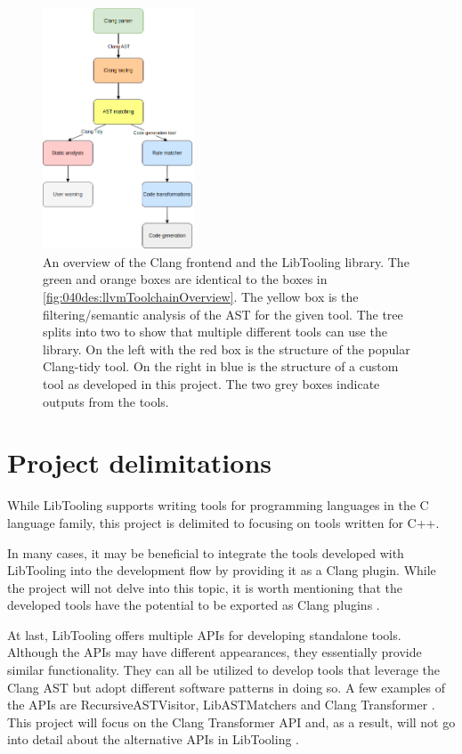 \begin{figure}[H]
    \centering
    \includegraphics[width=0.4\textwidth]{figs/040des/clang_tool_pipeline.png}
    \caption{An overview of the Clang frontend and the LibTooling library. The green and orange boxes are identical to the boxes in \cref{fig:040des:llvmToolchainOverview}. The yellow box is the filtering/semantic analysis of the AST for the given tool. The tree splits into two to show that multiple different tools can use the library. On the left with the red box is the structure of the popular Clang-tidy tool\cite{clangClangTidyExtraClang}. On the right in blue is the structure of a custom tool as developed in this project. The two grey boxes indicate outputs from the tools.}
    \label{fig:040des:clangToolingOverview}
\end{figure}


\section{Project delimitations}
While LibTooling supports writing tools for programming languages in the C language family, this project is delimited to focusing on tools written for C++.

In many cases, it may be beneficial to integrate the tools developed with LibTooling into the development flow by providing it as a Clang plugin.
While the project will not delve into this topic, it is worth mentioning that the developed tools have the potential to be exported as Clang plugins \cite{clangClangPluginsClang}.

At last, LibTooling offers multiple APIs for developing standalone tools. Although the APIs may have different appearances, they essentially provide similar functionality. They can all be utilized to develop tools that leverage the Clang AST but adopt different software patterns in doing so.
A few examples of the APIs are RecursiveASTVisitor, LibASTMatchers and Clang Transformer \cite{clangHowWriteRecursiveASTVisitor,clangWelcomeClangDocumentation}. This project will focus on the Clang Transformer API and, as a result, will not go into detail about the alternative APIs in LibTooling \cite{clangClangTransformerTutorial}.